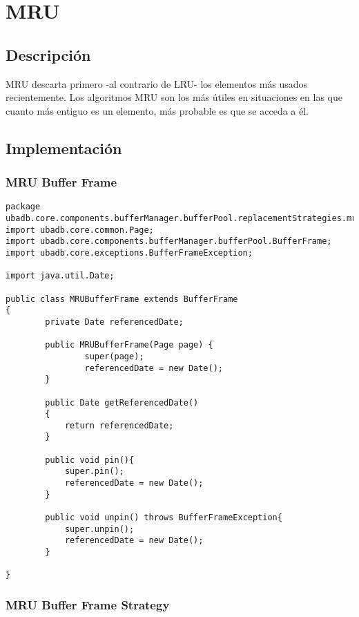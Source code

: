 \section{MRU}

\subsection{Descripción}

MRU descarta primero -al contrario de LRU- los elementos más usados recientemente.
Los algoritmos MRU son los más útiles en situaciones en las que cuanto más entiguo es un elemento, más probable es que se acceda a él.

\subsection{Implementación}
\subsubsection{MRU Buffer Frame}

\begin{lstlisting}
package ubadb.core.components.bufferManager.bufferPool.replacementStrategies.mru;
import ubadb.core.common.Page;
import ubadb.core.components.bufferManager.bufferPool.BufferFrame;
import ubadb.core.exceptions.BufferFrameException;

import java.util.Date;

public class MRUBufferFrame extends BufferFrame 
{
		private Date referencedDate;
	
        public MRUBufferFrame(Page page) {
                super(page); 
                referencedDate = new Date();
        }
        
        public Date getReferencedDate()
    	{
    		return referencedDate;
    	}
        
        public void pin(){
        	super.pin();
        	referencedDate = new Date();
        }
        
        public void unpin() throws BufferFrameException{
        	super.unpin();
        	referencedDate = new Date();
        }

}
\end{lstlisting}

\subsubsection{MRU Buffer Frame Strategy}

